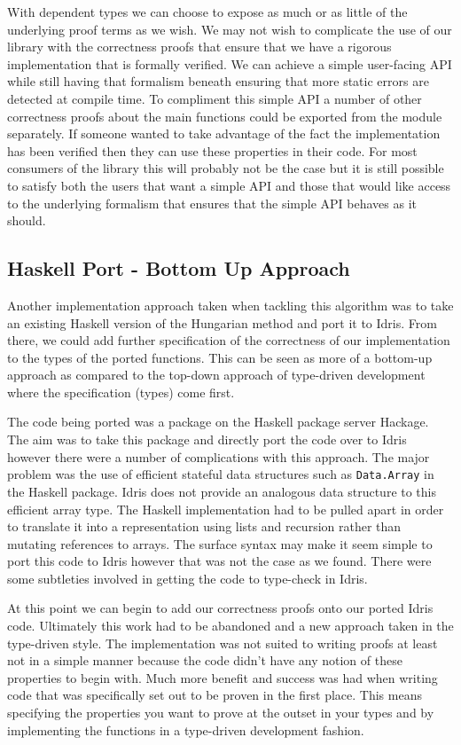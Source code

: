 \documentclass[a4paper, notitlepage]{report}
\begin{document}
With dependent types we can choose to expose as much or as little of the
underlying proof terms as we wish. We may not wish to complicate the use of our
library with the correctness proofs that ensure that we have a rigorous
implementation that is formally verified. We can achieve a simple user-facing
API while still having that formalism beneath ensuring that more static errors
are detected at compile time. To compliment this simple API a number of other
correctness proofs about the main functions could be exported from the module
separately. If someone wanted to take advantage of the fact the implementation
has been verified then they can use these properties in their code. For most
consumers of the library this will probably not be the case but it is still
possible to satisfy both the users that want a simple API and those that would
like access to the underlying formalism that ensures that the simple API behaves
as it should.

\subsection{Haskell Port - Bottom Up Approach}
\label{sec:org58bd0f3}
Another implementation approach taken when tackling this algorithm was to take
an existing Haskell version of the Hungarian method and port it to Idris. From
there, we could add further specification of the correctness of our
implementation to the types of the ported functions. This can be seen as more of
a bottom-up approach as compared to the top-down approach of type-driven
development where the specification (types) come first.

The code being ported was a package \cite{komuves_munkres_2008} on the Haskell
package server Hackage. The aim was to take this package and directly port the
code over to Idris however there were a number of complications with this
approach. The major problem was the use of efficient stateful data structures
such as \texttt{Data.Array} in the Haskell package. Idris does not provide an analogous
data structure to this efficient array type. The Haskell implementation had to
be pulled apart in order to translate it into a representation using lists and
recursion rather than mutating references to arrays. The surface syntax may make
it seem simple to port this code to Idris however that was not the case as we
found. There were some subtleties involved in getting the code to type-check in
Idris.

At this point we can begin to add our correctness proofs onto our ported Idris
code. Ultimately this work had to be abandoned and a new approach taken in the
type-driven style. The implementation was not suited to writing proofs at least
not in a simple manner because the code didn't have any notion of these
properties to begin with. Much more benefit and success was had when writing
code that was specifically set out to be proven in the first place. This means
specifying the properties you want to prove at the outset in your types and by
implementing the functions in a type-driven development fashion.
\end{document}
